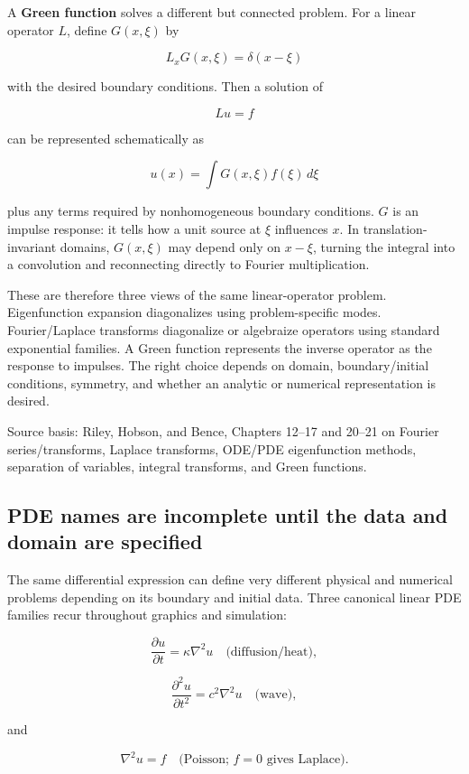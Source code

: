 A \textbf{Green function} solves a different but connected problem. For a linear operator \(L\), define \(G(x,\xi)\) by

\[
L_x G(x,\xi)=\delta(x-\xi)
\]

with the desired boundary conditions. Then a solution of

\[
L u=f
\]

can be represented schematically as

\[
u(x)
=
\int G(x,\xi)f(\xi)\,d\xi
\]

plus any terms required by nonhomogeneous boundary conditions. \(G\) is an impulse response: it tells how a unit source at \(\xi\) influences \(x\). In translation-invariant domains, \(G(x,\xi)\) may depend only on \(x-\xi\), turning the integral into a convolution and reconnecting directly to Fourier multiplication.

These are therefore three views of the same linear-operator problem. Eigenfunction expansion diagonalizes using problem-specific modes. Fourier/Laplace transforms diagonalize or algebraize operators using standard exponential families. A Green function represents the inverse operator as the response to impulses. The right choice depends on domain, boundary/initial conditions, symmetry, and whether an analytic or numerical representation is desired.

Source basis: Riley, Hobson, and Bence, Chapters 12--17 and 20--21 on Fourier series/transforms, Laplace transforms, ODE/PDE eigenfunction methods, separation of variables, integral transforms, and Green functions.

\subsection{PDE names are incomplete until the data and domain are specified}\label{02-foundations-ii-ch025-pde-names-are-incomplete-until-the-data-and-domain-are-specified}

The same differential expression can define very different physical and numerical problems depending on its boundary and initial data. Three canonical linear PDE families recur throughout graphics and simulation:

\[
\frac{\partial u}{\partial t}
=
\kappa\nabla^2u
\quad\text{(diffusion/heat)},
\]

\[
\frac{\partial^2u}{\partial t^2}
=
c^2\nabla^2u
\quad\text{(wave)},
\]

and

\[
\nabla^2u=f
\quad\text{(Poisson; \(f=0\) gives Laplace)}.
\]

